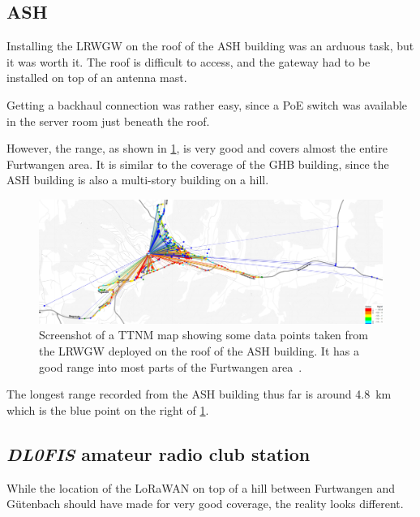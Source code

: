 \subsection{\acl{ASH}}

Installing the \acl{LRWGW} on the roof of the \ac{ASH} building was an arduous task, but it was worth it.
The roof is difficult to access, and the gateway had to be installed on top of an antenna mast.

Getting a backhaul connection was rather easy, since a \ac{PoE} switch was available in the server room just beneath the roof.

However, the range, as shown in \cref{pic:ash_gw_range}, is very good and covers almost the entire Furtwangen area.
It is similar to the coverage of the \ac{GHB} building, since the \ac{ASH} building is also a multi-story building on a hill.

\begin{figure}[htbp]
    \centering
    \includegraphics[width=1\textwidth]{pictures/ttn-mapper/gateway-ranges/ash_gw_range.jpg}
    \caption{
        Screenshot of a \ac{TTNM} map showing some data points taken from the \acl{LRWGW} deployed on the roof of the \ac{ASH} building.
        It has a good range into most parts of the Furtwangen area~\cite{ttn_mapper_ttn_2023}.
    }\label{pic:ash_gw_range}
\end{figure}

The longest range recorded from the \ac{ASH} building thus far is around \SI{4.8}{\kilo\meter} which is the blue point on the right of \cref{pic:ash_gw_range}.

\subsection{\emph{DL0FIS} amateur radio club station}

While the location of the \ac{LoRaWAN} on top of a hill between Furtwangen and Gütenbach should have made for very good coverage, the reality looks different.

